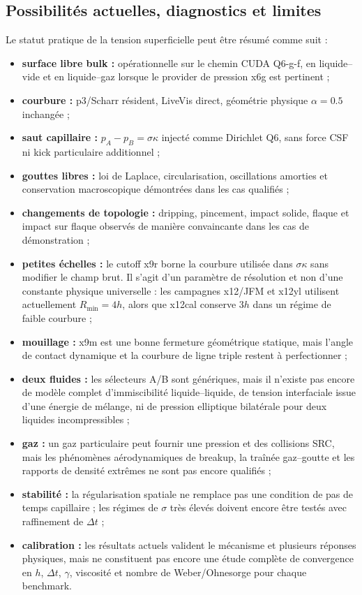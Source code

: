 \documentclass[11pt,a4paper]{article}
\begin{document}
\subsection{Possibilités actuelles, diagnostics et limites}

Le statut pratique de la tension superficielle peut être résumé comme suit :
\begin{itemize}[leftmargin=2em]
  \item \textbf{surface libre bulk :} opérationnelle sur le chemin CUDA Q6-g-f, en liquide--vide et en liquide--gaz lorsque le provider de pression x6g est pertinent ;
  \item \textbf{courbure :} p3/Scharr résident, LiveVis direct, géométrie physique $\alpha=0.5$ inchangée ;
  \item \textbf{saut capillaire :} $p_A-p_B=\sigma\kappa$ injecté comme Dirichlet Q6, sans force CSF ni kick particulaire additionnel ;
  \item \textbf{gouttes libres :} loi de Laplace, circularisation, oscillations amorties et conservation macroscopique démontrées dans les cas qualifiés ;
  \item \textbf{changements de topologie :} dripping, pincement, impact solide, flaque et impact sur flaque observés de manière convaincante dans les cas de démonstration ;
  \item \textbf{petites échelles :} le cutoff x9r borne la courbure utilisée dans $\sigma\kappa$ sans modifier le champ brut. Il s'agit d'un paramètre de résolution et non d'une constante physique universelle : les campagnes x12/JFM et x12yl utilisent actuellement $R_{\min}=4h$, alors que x12cal conserve $3h$ dans un régime de faible courbure ;
  \item \textbf{mouillage :} x9m est une bonne fermeture géométrique statique, mais l'angle de contact dynamique et la courbure de ligne triple restent à perfectionner ;
  \item \textbf{deux fluides :} les sélecteurs A/B sont génériques, mais il n'existe pas encore de modèle complet d'immiscibilité liquide--liquide, de tension interfaciale issue d'une énergie de mélange, ni de pression elliptique bilatérale pour deux liquides incompressibles ;
  \item \textbf{gaz :} un gaz particulaire peut fournir une pression et des collisions SRC, mais les phénomènes aérodynamiques de breakup, la traînée gaz--goutte et les rapports de densité extrêmes ne sont pas encore qualifiés ;
  \item \textbf{stabilité :} la régularisation spatiale ne remplace pas une condition de pas de temps capillaire ; les régimes de $\sigma$ très élevés doivent encore être testés avec raffinement de $\Delta t$ ;
  \item \textbf{calibration :} les résultats actuels valident le mécanisme et plusieurs réponses physiques, mais ne constituent pas encore une étude complète de convergence en $h$, $\Delta t$, $\gamma$, viscosité et nombre de Weber/Ohnesorge pour chaque benchmark.
\end{itemize}
\end{document}
